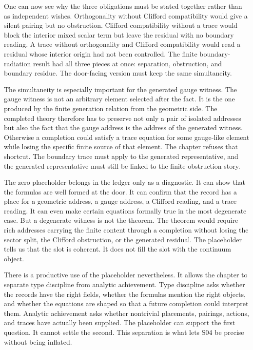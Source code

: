 One can now see why the three obligations must be stated together rather than
as independent wishes. Orthogonality without Clifford compatibility would give
a silent pairing but no obstruction. Clifford compatibility without a trace
would block the interior mixed scalar term but leave the residual with no
boundary reading. A trace without orthogonality and Clifford compatibility
would read a residual whose interior origin had not been controlled. The finite
boundary-radiation result had all three pieces at once: separation,
obstruction, and boundary residue. The door-facing version must keep the same
simultaneity.

The simultaneity is especially important for the generated gauge witness. The
gauge witness is not an arbitrary element selected after the fact. It is the
one produced by the finite generation relation from the geometric side. The
completed theory therefore has to preserve not only a pair of isolated
addresses but also the fact that the gauge address is the address of the
generated witness. Otherwise a completion could satisfy a trace equation for
some gauge-like element while losing the specific finite source of that
element. The chapter refuses that shortcut. The boundary trace must apply to
the generated representative, and the generated representative must still be
linked to the finite obstruction story.

The zero placeholder belongs in the ledger only as a diagnostic. It can show
that the formulas are well formed at the door. It can confirm that the record
has a place for a geometric address, a gauge address, a Clifford reading, and a
trace reading. It can even make certain equations formally true in the most
degenerate case. But a degenerate witness is not the theorem. The theorem
would require rich addresses carrying the finite content through a completion
without losing the sector split, the Clifford obstruction, or the generated
residual. The placeholder tells us that the slot is coherent. It does not fill
the slot with the continuum object.

There is a productive use of the placeholder nevertheless. It allows the
chapter to separate type discipline from analytic achievement. Type discipline
asks whether the records have the right fields, whether the formulas mention
the right objects, and whether the equations are shaped so that a future
completion could interpret them. Analytic achievement asks whether nontrivial
placements, pairings, actions, and traces have actually been supplied. The
placeholder can support the first question. It cannot settle the second. This
separation is what lets S04 be precise without being inflated.

